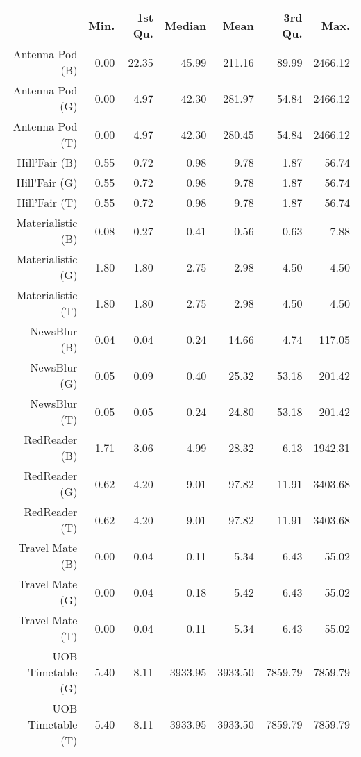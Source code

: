 \begin{table}[ht]
\centering
\begin{tabular}{rrrrrrr}
  \hline
 & Min. & 1st Qu. & Median & Mean & 3rd Qu. & Max. \\ 
  \hline
Antenna Pod (B) & 0.00 & 22.35 & 45.99 & 211.16 & 89.99 & 2466.12 \\ 
  Antenna Pod (G) & 0.00 & 4.97 & 42.30 & 281.97 & 54.84 & 2466.12 \\ 
  Antenna Pod (T) & 0.00 & 4.97 & 42.30 & 280.45 & 54.84 & 2466.12 \\ 
  Hill'Fair (B) & 0.55 & 0.72 & 0.98 & 9.78 & 1.87 & 56.74 \\ 
  Hill'Fair (G) & 0.55 & 0.72 & 0.98 & 9.78 & 1.87 & 56.74 \\ 
  Hill'Fair (T) & 0.55 & 0.72 & 0.98 & 9.78 & 1.87 & 56.74 \\ 
  Materialistic (B) & 0.08 & 0.27 & 0.41 & 0.56 & 0.63 & 7.88 \\ 
  Materialistic (G) & 1.80 & 1.80 & 2.75 & 2.98 & 4.50 & 4.50 \\ 
  Materialistic (T) & 1.80 & 1.80 & 2.75 & 2.98 & 4.50 & 4.50 \\ 
  NewsBlur (B) & 0.04 & 0.04 & 0.24 & 14.66 & 4.74 & 117.05 \\ 
  NewsBlur (G) & 0.05 & 0.09 & 0.40 & 25.32 & 53.18 & 201.42 \\ 
  NewsBlur (T) & 0.05 & 0.05 & 0.24 & 24.80 & 53.18 & 201.42 \\ 
  RedReader (B) & 1.71 & 3.06 & 4.99 & 28.32 & 6.13 & 1942.31 \\ 
  RedReader (G) & 0.62 & 4.20 & 9.01 & 97.82 & 11.91 & 3403.68 \\ 
  RedReader (T) & 0.62 & 4.20 & 9.01 & 97.82 & 11.91 & 3403.68 \\ 
  Travel Mate (B) & 0.00 & 0.04 & 0.11 & 5.34 & 6.43 & 55.02 \\ 
  Travel Mate (G) & 0.00 & 0.04 & 0.18 & 5.42 & 6.43 & 55.02 \\ 
  Travel Mate (T) & 0.00 & 0.04 & 0.11 & 5.34 & 6.43 & 55.02 \\ 
  UOB Timetable (G) & 5.40 & 8.11 & 3933.95 & 3933.50 & 7859.79 & 7859.79 \\ 
  UOB Timetable (T) & 5.40 & 8.11 & 3933.95 & 3933.50 & 7859.79 & 7859.79 \\ 
   \hline
\end{tabular}
\end{table}
